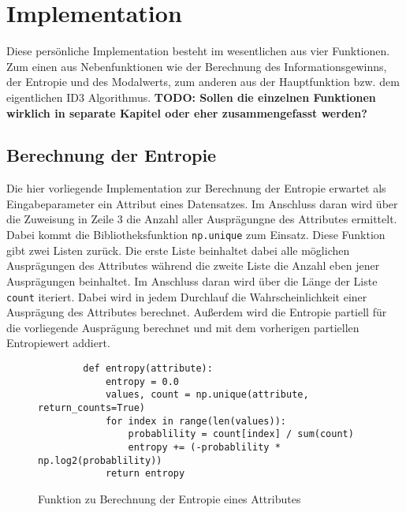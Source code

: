 \section{Implementation}
\label{id3:implementation}

Diese persönliche Implementation besteht im wesentlichen aus vier Funktionen. Zum einen aus Nebenfunktionen wie der Berechnung des Informationsgewinns, der Entropie und des Modalwerts, zum anderen aus der Hauptfunktion bzw. dem eigentlichen ID3 Algorithmus.
\textbf{TODO: Sollen die einzelnen Funktionen wirklich in separate Kapitel oder eher zusammengefasst werden?}

\subsection{Berechnung der Entropie}
\label{id3:implementation-entropie}
Die hier vorliegende Implementation zur Berechnung der Entropie erwartet als Eingabeparameter ein Attribut eines Datensatzes. Im Anschluss daran wird über die Zuweisung in Zeile 3 die Anzahl aller Ausprägungne des Attributes ermittelt. Dabei kommt die Bibliotheksfunktion \texttt{np.unique} zum Einsatz. Diese Funktion gibt zwei Listen zurück. Die erste Liste beinhaltet dabei alle möglichen Ausprägungen des Attributes während die zweite Liste die Anzahl eben jener Ausprägungen beinhaltet. Im Anschluss daran wird über die Länge der Liste \texttt{count} iteriert. Dabei wird in jedem Durchlauf die Wahrscheinlichkeit einer Ausprägung des Attributes berechnet. Außerdem wird die Entropie partiell für die vorliegende Ausprägung berechnet und mit dem vorherigen partiellen Entropiewert addiert.

\begin{figure}[H]
    \vspace{0.5cm}
    \centering
    \begin{verbatim}
        def entropy(attribute):
            entropy = 0.0
            values, count = np.unique(attribute, return_counts=True)
            for index in range(len(values)):
                probablility = count[index] / sum(count)
                entropy += (-probablility * np.log2(probablility))
            return entropy
    \end{verbatim}
    \caption{Funktion zu Berechnung der Entropie eines Attributes\autocites{PythonCourseDecisionTrees:online}{ImplementationID3}}
\end{figure}

